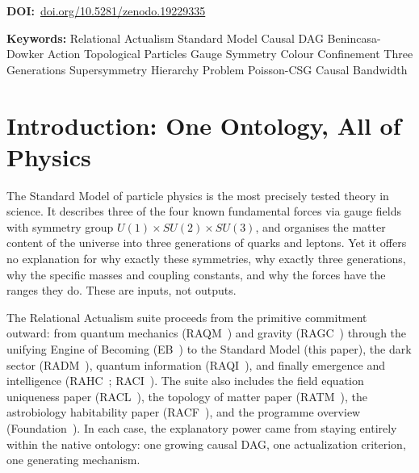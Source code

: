\documentclass[11pt,a4paper]{article}
\begin{document}
\medskip\noindent
\textbf{DOI:}~\href{https://doi.org/10.5281/zenodo.19229335}{doi.org/10.5281/zenodo.19229335}

\medskip\noindent
\textbf{Keywords:} Relational Actualism \textperiodcentered{}
Standard Model \textperiodcentered{} Causal DAG \textperiodcentered{}
Benincasa-Dowker Action \textperiodcentered{} Topological Particles
\textperiodcentered{} Gauge Symmetry \textperiodcentered{}
Colour Confinement \textperiodcentered{} Three Generations
\textperiodcentered{} Supersymmetry \textperiodcentered{}
Hierarchy Problem \textperiodcentered{} Poisson-CSG
\textperiodcentered{} Causal Bandwidth



\section{Introduction: One Ontology, All of Physics}
\label{sec:intro}

The Standard Model of particle physics is the most precisely tested theory in
science. It describes three of the four known fundamental forces via gauge
fields with symmetry group $U(1) \times SU(2) \times SU(3)$, and organises
the matter content of the universe into three generations of quarks and leptons.
Yet it offers no explanation for why exactly these symmetries, why exactly three
generations, why the specific masses and coupling constants, and why the forces
have the ranges they do. These are inputs, not outputs.

The Relational Actualism suite proceeds from the primitive commitment outward:
from quantum mechanics (RAQM~\citep{Sandeman2026RAQM}) and gravity
(RAGC~\citep{Sandeman2026RAGC}) through the unifying Engine of Becoming
(EB~\citep{Sandeman2026RAEB}) to the Standard Model (this paper), the dark
sector (RADM~\citep{Sandeman2026RADM}), quantum information
(RAQI~\citep{Sandeman2026RAQI}), and finally emergence and intelligence
(RAHC~\citep{Sandeman2026RAHC}; RACI~\citep{Sandeman2026RACI}).
The suite also includes the field equation uniqueness paper
(RACL~\citep{Sandeman2026RACL}), the topology of matter paper
(RATM~\citep{Sandeman2026RATM}), the astrobiology habitability paper
(RACF~\citep{Sandeman2026RACF}), and the programme overview
(Foundation~\citep{Sandeman2026Foundation}).
In each case, the
explanatory power came from staying entirely within the native ontology: one
growing causal DAG, one actualization criterion, one generating mechanism.
\end{document}
